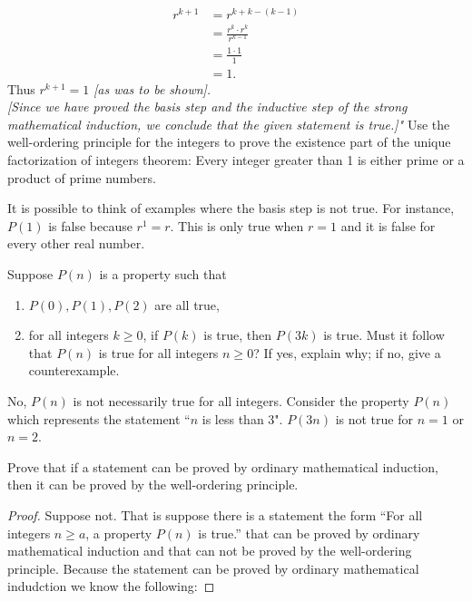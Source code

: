 \documentclass[12pt,letterpaper, onecolumn]{exam}
\begin{document}
\begin{questions}
		\begin{align*}
			r^{k+1}&=r^{k+k-(k-1)}\tag{$k+k-(k-1) = k+k-k+1 = k+1$}\\
			&=\frac{r^k\cdot r^k}{r^{k-1}}\tag{by the laws of exponents}\\
			&=\frac{1\cdot1}{1}\tag{by inductive hypothesis}\\
			&=1.
		\end{align*}
	Thus $r^{k+1}=1$ \textit{[as was to be shown].}\\
	\textit{[Since we have proved the basis step and the inductive step of the strong mathematical induction, we conclude that the given statement is true.]"}
	\setcounter{question}{20} \question Use the well-ordering principle for the integers to prove the existence part of the unique factorization of integers theorem: Every integer greater than 1 is either prime or a product of prime numbers.
	\begin{solution}
		It is possible to think of examples where the basis step is not true. For instance, $P(1)$ is false because $r^1=r$. This is only true when $r=1$ and it is false for every other real number.
	\end{solution}
	\setcounter{question}{25} \question Suppose $P(n)$ is a property such that
	\begin{enumerate}
	\item $P(0), P(1), P(2)$ are all true,
	\item for all integers $k\geq0$, if $P(k)$ is true, then $P(3k)$ is true. Must it follow that $P(n)$ is true for all integers $n\geq0$? If yes, explain why; if no, give a counterexample.
	\end{enumerate}
	\begin{solution}
		No, $P(n)$ is not necessarily true for all integers. Consider the property $P(n)$ which represents the statement ``$n$ is less than 3". $P(3n)$ is not true for $n=1$ or $n=2$.
	\end{solution}
	\setcounter{question}{31}\question Prove that if a statement can be proved by ordinary mathematical induction, then it can be proved by the well-ordering principle.
	\begin{solution}
		\begin{proof}
		Suppose not. That is suppose there is a statement the form ``For all integers $n\geq a$, a property $P(n)$ is true.” that can be proved by ordinary mathematical induction and that can not be proved by the well-ordering principle. Because the statement can be proved by ordinary mathematical indudction we know the following:

\end{proof}
\end{solution}
\end{questions}
\end{document}

